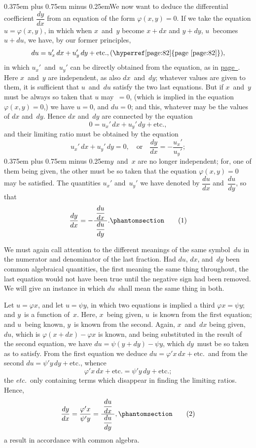 \documentclass[12pt]{book}[2005/09/16]
\newcommand{\Chg}[2]{#2}
\newcommand{\Add}[1]{\Chg{}{#1}}
\newcommand{\Loosen}{\spaceskip 0.375em plus 0.75em minus 0.25em}
\newcounter{SecNo}
\newcommand{\Pagelabel}[1]{\phantomsection\label{page:#1}}
\newcommand{\PageSep}[1]{\Pagelabel{#1}\ignorespaces}
\newcommand{\PageRef}[2][page]{\hyperref[page:#2]{#1~\pageref*{page:#2}}}
\renewcommand{\etc}{\text{etc}}
\renewcommand{\(}{{\upshape(}}
\renewcommand{\)}{{\upshape)}}
\newcommand{\ux}{u_{x}'}
\newcommand{\uy}{u_{y}'}
\renewcommand{\phi}{\varphi}
\newcommand{\Tag}[1]{%
  \phantomsection\label{eqn:\theSecNo.#1}\tag*{\ensuremath{#1}}%
}
\begin{document}
{\Loosen We now want to deduce the differential coefficient
$\dfrac{dy}{dx}$ from an equation of the form $\phi(x, y) = 0$. If we
take the equation $u = \phi(x, y)$, in which when $x$~and~$y$
become $x + dx$ and $y + dy$, $u$~becomes $u + du$, we have,
by our former principles,}
\[
du = \ux\, dx + \uy\, dy + \etc., \text{(\PageRef{82})},
\]
in which $\ux$~and~$\uy$ can be directly obtained from the
equation, as in \PageRef{82}. Here $x$~and~$y$ are independent,
as also $dx$~and~$dy$; whatever values are given to
them, it is sufficient that $u$~and~$du$ satisfy the two last
equations. But if $x$~and~$y$ must be always so taken
that $u$ may~$= 0$, (which is implied in the equation
$\phi(x, y) = 0$,) we have $u = 0$, and $du = 0$; and this,
whatever may be the values of $dx$ and~$dy$. Hence $dx$
and~$dy$ are connected by the equation
\[
0 = \ux\, dx + \uy\, dy + \etc.,
\]
and their limiting ratio must be obtained by the equation
\[
\ux\, dx + \uy\, dy = 0, \quad\text{or}\quad \frac{dy}{dx} = -\frac{\ux}{\uy};
\]
{\Loosen $y$~and~$x$ are no longer independent; for, one of them
being given, the other must be so taken that the equation
$\phi(x, y) = 0$ may be satisfied. The quantities $\ux$
%
%
and~$\uy$ we have denoted by $\dfrac{du}{dx}$ and~$\dfrac{du}{dy}$, so that}
\[
\frac{dy}{dx} = -\frac{\;\dfrac{du}{dx}\;}{\dfrac{du}{dy}}\Add{.}
\Tag{(1)}
\]
\PageSep{109}

We must again call attention to the different meanings
of the same symbol~$du$ in the numerator and denominator
of the last fraction. Had $du$, $dx$, and~$dy$
been common algebraical quantities, the first meaning
the same thing throughout, the last equation would
not have been true until the negative sign had been
removed. We will give an instance in which $du$~shall
mean the same thing in both.

Let $u = \Chg{\phi(x)}{\phi x}$, and let $u = \psi y$, in which two equations
is implied a third $\phi x = \psi y$; and $y$~is a function
of~$x$. Here, $x$~being given, $u$~is known from the first
equation; and $u$~being known, $y$~is known from the
second. Again, $x$~and~$dx$ being given, $du$, which is
$\phi(x + dx) - \phi x$ is known, and being substituted in
the result of the second equation, we have $du = \psi(y + dy) - \psi y$,
which $dy$~must be so taken as to
satisfy. From the first equation we deduce $du = \phi'x\, dx + \etc.$\
and from the second $du = \psi' y\, dy + \etc.$,
whence
\[
\phi' x\, dx + \etc. = \psi' y\, dy + \etc.;
\]
the \emph{etc.}\ only containing terms which disappear in finding
the limiting ratios. Hence,
\[
\frac{dy}{dx} = \frac{\phi' x}{\psi' y}
  = \frac{\;\dfrac{du}{dx}\;}{\dfrac{du}{dy}}\Add{,}
\Tag{(2)}
\]
a result in accordance with common algebra.
\end{document}
